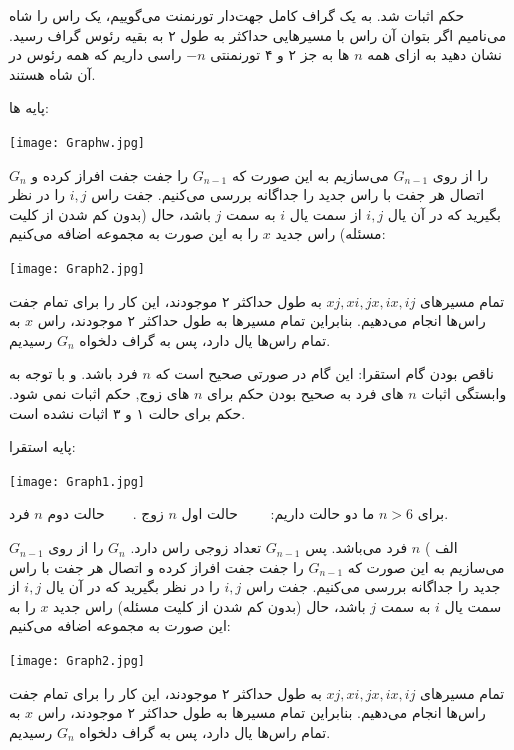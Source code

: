 \documentclass[11pt,largemargins]{h2wp}
\begin{document}
  حکم اثبات شد.
 \question
به یک گراف کامل جهت‌دار تورنمنت می‌گوییم، یک راس را شاه می‌نامیم اگر بتوان آن راس با مسیر‌هایی حداکثر به طول ۲ به بقیه رئوس گراف رسید. نشان دهید به ازای همه 
    $n$ ها به جز ۲ و ۴ تورنمنتی 
    $-n$ راسی داریم که همه رئوس در آن شاه هستند.    
\solution


پایه ها:


   {\hspace*{5cm}\texttt{[image: Graphw.jpg]}}    
   
 
   $G_{n}$ را از روی 
    $G_{n-1}$ می‌سازیم به این صورت که  $G_{n-1}$ را جفت جفت افراز کرده و اتصال هر جفت با راس جدید را جداگانه بررسی می‌کنیم. جفت راس $i, j$ را در نظر بگیرید که در آن یال $i, j$ از سمت یال $i$ به سمت 
    $j$
     باشد، حال 
     (بدون کم شدن از کلیت مسئله)
      راس جدید
     $x$
      را به این صورت به مجموعه اضافه می‌کنیم:
    
       {\hspace*{6cm}\texttt{[image: Graph2.jpg]}}    
       
    تمام مسیر‌های
    $xj, xi, jx, ix, ij$ به طول حداکثر ۲ موجودند، این کار را برای تمام جفت راس‌ها انجام می‌دهیم. بنابراین تمام مسیر‌ها به طول حداکثر ۲ موجودند، راس $x$ به تمام راس‌ها یال دارد، پس به گراف دلخواه $G_{n}$ رسیدیم.
    
\notes
{}
ناقص بودن گام استقرا:
این گام در صورتی صحیح است که $n$ فرد باشد.
و با توجه به وابستگی اثبات $n$ های فرد به صحیح بودن حکم برای $n$ های زوج, حکم اثبات نمی شود.
حکم برای حالت ۱ و ۳ اثبات نشده است.


پایه استقرا:


   {\hspace*{5cm}\texttt{[image: Graph1.jpg]}}    
   
   برای $n>6$ ما دو حالت داریم: $\; \; \; \; \; \;$ حالت اول $n$ زوج
   .$\; \; \; \; \; \;$
   حالت دوم $n$ فرد.   
   
    الف ) $n$ فرد می‌باشد. پس
    $G_{n-1}$ تعداد زوجی راس دارد. $G_{n}$ را از روی 
    $G_{n-1}$ می‌سازیم به این صورت که  $G_{n-1}$ را جفت جفت افراز کرده و اتصال هر جفت با راس جدید را جداگانه بررسی می‌کنیم. جفت راس $i, j$ را در نظر بگیرید که در آن یال $i, j$ از سمت یال $i$ به سمت
     $j$   باشد، حال 
     (بدون کم شدن از کلیت مسئله)
      راس جدید
     $x$
      را به این صورت به مجموعه اضافه می‌کنیم:

    
       {\hspace*{6cm}\texttt{[image: Graph2.jpg]}}    
       
    تمام مسیر‌های
    $xj, xi, jx, ix, ij$ به طول حداکثر ۲ موجودند، این کار را برای تمام جفت راس‌ها انجام می‌دهیم. بنابراین تمام مسیر‌ها به طول حداکثر ۲ موجودند، راس $x$ به تمام راس‌ها یال دارد، پس به گراف دلخواه $G_{n}$ رسیدیم.
    
\end{document}
